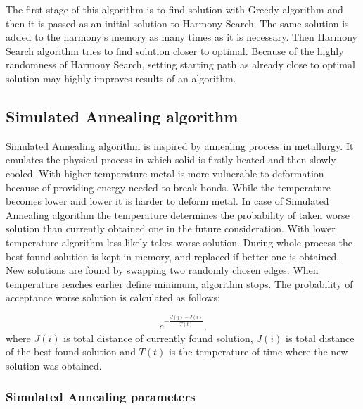 \documentclass[titlepage]{article}
\begin{document}
The first stage of this algorithm is to find solution with Greedy algorithm and then it is passed as an initial solution to Harmony Search. The same solution is added to the harmony's memory as many times as it is necessary. Then Harmony Search algorithm tries to find solution closer to optimal. Because of the highly randomness of Harmony Search, setting starting path as already close to optimal solution may highly improves results of an algorithm.

\subsection{Simulated Annealing algorithm}

Simulated Annealing algorithm is inspired by annealing process in metallurgy. It emulates the physical process in which solid is firstly heated and then slowly cooled. With higher temperature metal is more vulnerable to deformation because of providing energy needed to break bonds. While the temperature becomes lower and lower it is harder to deform metal. In case of Simulated Annealing algorithm the temperature determines the probability of taken worse solution than currently obtained one in the future consideration. With lower temperature algorithm less likely takes worse solution. During whole process the best found solution is kept in memory, and replaced if better one is obtained. New solutions are found by swapping two randomly chosen edges. When temperature reaches earlier define minimum, algorithm stops. The probability of acceptance worse solution is calculated as follows:

\[e^{-\frac{J(j)-J(i)}{T(t)}}\mbox{,}\]
	where $J(i)$ is total distance of currently found solution, $J(i)$ is total distance of the best found solution and $T(t)$ is the temperature of time where the new solution was obtained.


\subsubsection{Simulated Annealing parameters}
\end{document}
